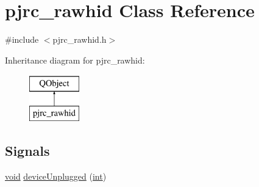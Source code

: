 \hypertarget{classpjrc__rawhid}{\section{pjrc\-\_\-rawhid Class Reference}
\label{classpjrc__rawhid}
}


{\ttfamily \#include $<$pjrc\-\_\-rawhid.\-h$>$}

Inheritance diagram for pjrc\-\_\-rawhid\-:\begin{figure}[H]
\begin{center}
\leavevmode
\includegraphics[height=2.000000cm]{classpjrc__rawhid}
\end{center}
\end{figure}
\subsection*{Signals}
\begin{DoxyCompactItemize}
\item 
\hyperlink{group___u_a_v_objects_plugin_ga444cf2ff3f0ecbe028adce838d373f5c}{void} \hyperlink{group___raw_h_i_d_plugin_ga214c3f073c411ac80306d36644715d8c}{device\-Unplugged} (\hyperlink{ioapi_8h_a787fa3cf048117ba7123753c1e74fcd6}{int})
\end{DoxyCompactItemize}
